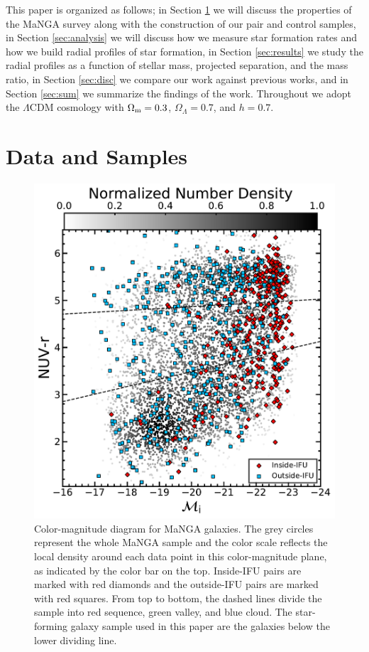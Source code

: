 \documentclass[iop,revtex4,twocolumn,apj,numberedappendix,appendixfloats]{emulateapj}
\begin{document}
This paper is organized as follows; in Section \ref{sec:data} we will discuss the properties of the MaNGA survey along with the construction of our pair and control samples, in Section \ref{sec:analysis} we will discuss how we measure star formation rates and how we build radial profiles of star formation, in Section \ref{sec:results} we study the radial profiles as a function of stellar mass, projected separation, and the mass ratio, in Section \ref{sec:disc} we compare our work against previous works, and in Section \ref{sec:sum} we summarize the findings of the work. 
Throughout we adopt the $\Lambda$CDM cosmology with $\Omega_{\rm m}=0.3$, $\Omega_\Lambda=0.7$, and $h=0.7$. 

\section{Data and Samples}\label{sec:data}

\begin{figure}
\centering
\includegraphics[width=\linewidth]{fig/color-mag.pdf}
\caption[]{Color-magnitude diagram for MaNGA galaxies. The grey circles represent the whole MaNGA sample and the color scale reflects the local density around each data point in this color-magnitude plane, as indicated by the color bar on the top. Inside-IFU pairs are marked with red diamonds and the outside-IFU pairs are marked with red squares. From top to bottom, the dashed lines divide the sample into red sequence, green valley, and blue cloud. The star-forming galaxy sample used in this paper are the galaxies below the lower dividing line.}
\label{fig:cmd}
\end{figure}
\end{document}
